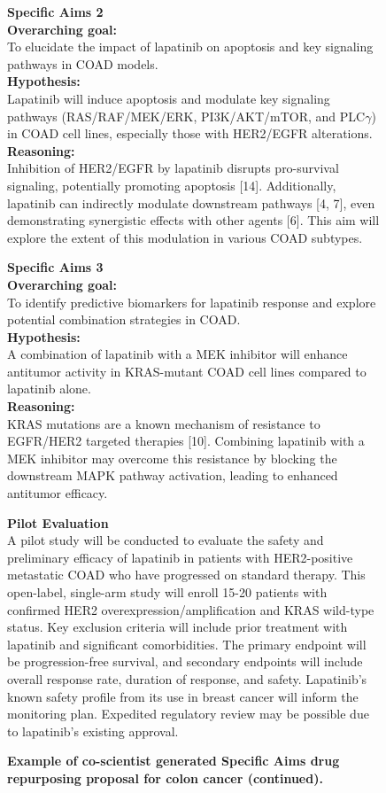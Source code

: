 \begin{figure}[htbp!]
\caption{\textbf{Example of co-scientist generated Specific Aims drug repurposing proposal for colon cancer (continued).}}
\label{fig:aim3_2}
\vspace{0.1cm}
\begin{tcolorbox}[title=Lapatinib for colon cancer (continued)]
\footnotesize
\textbf{Specific Aims 2}\\
\textbf{Overarching goal:}\\
To elucidate the impact of lapatinib on apoptosis and key signaling pathways in COAD models.\\
\textbf{Hypothesis:}\\
Lapatinib will induce apoptosis and modulate key signaling pathways (RAS/RAF/MEK/ERK, PI3K/AKT/mTOR, and PLC$\gamma$) in COAD cell lines, especially those with HER2/EGFR alterations.\\
\textbf{Reasoning:}\\
Inhibition of HER2/EGFR by lapatinib disrupts pro-survival signaling, potentially promoting apoptosis [14].  Additionally, lapatinib can indirectly modulate downstream pathways [4, 7], even demonstrating synergistic effects with other agents [6]. This aim will explore the extent of this modulation in various COAD subtypes.

\textbf{Specific Aims 3}\\
\textbf{Overarching goal:}\\
To identify predictive biomarkers for lapatinib response and explore potential combination strategies in COAD.\\
\textbf{Hypothesis:}\\
A combination of lapatinib with a MEK inhibitor will enhance antitumor activity in KRAS-mutant COAD cell lines compared to lapatinib alone.\\
\textbf{Reasoning:}\\
KRAS mutations are a known mechanism of resistance to EGFR/HER2 targeted therapies [10]. Combining lapatinib with a MEK inhibitor may overcome this resistance by blocking the downstream MAPK pathway activation, leading to enhanced antitumor efficacy.

\textbf{Pilot Evaluation}\\
A pilot study will be conducted to evaluate the safety and preliminary efficacy of lapatinib in patients with HER2-positive metastatic COAD who have progressed on standard therapy. This open-label, single-arm study will enroll 15-20 patients with confirmed HER2 overexpression/amplification and KRAS wild-type status. Key exclusion criteria will include prior treatment with lapatinib and significant comorbidities. The primary endpoint will be progression-free survival, and secondary endpoints will include overall response rate, duration of response, and safety. Lapatinib's known safety profile from its use in breast cancer will inform the monitoring plan. Expedited regulatory review may be possible due to lapatinib's existing approval.


\end{tcolorbox}
\end{figure}
